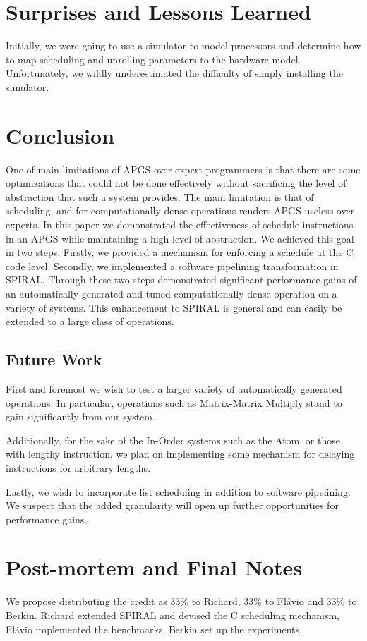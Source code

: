 \documentclass[10pt]{article}
\begin{document}
\section{Surprises and Lessons Learned}
Initially, we were going to use a simulator to model processors and determine
how to map scheduling and unrolling parameters to the hardware
model. Unfortunately, we wildly underestimated the difficulty of simply
installing the simulator.

\section{Conclusion}

One of main limitations of APGS over expert programmers is that there are some
optimizations that could not be done effectively without sacrificing the level
of abstraction that such a system provides. The main limitation is that of
scheduling, and for computationally dense operations renders APGS useless over
experts. In this paper we demonstrated the effectiveness of schedule
instructions in an APGS while maintaining a high level of abstraction. We
achieved this goal in two steps. Firstly, we provided a mechanism for enforcing
a schedule at the C code level. Secondly, we implemented a software pipelining
transformation in SPIRAL. Through these two steps demonstrated significant
performance gains of an automatically generated and tuned computationally
dense operation on a variety of systems. This enhancement to SPIRAL is general
and can easily be extended to a large class of operations.

\subsection{Future Work}
First and foremost we wish to test a larger variety of automatically generated
operations. In particular, operations such as Matrix-Matrix Multiply stand to
gain significantly from our system.

Additionally, for the sake of the In-Order systems such as the Atom, or those
with lengthy instruction, we plan on implementing some mechanism for delaying
instructions for arbitrary lengths.

Lastly, we wish to incorporate list scheduling in addition to software
pipelining. We suspect that the added granularity will open up further
opportunities for performance gains.


\section{Post-mortem and Final Notes}

We propose distributing the credit as 33\% to Richard, 33\% to Flávio and 33\% to Berkin.
Richard extended SPIRAL and devised the C scheduling mechanism, Flávio
implemented the benchmarks, Berkin set up the experiments.



\end{document}

